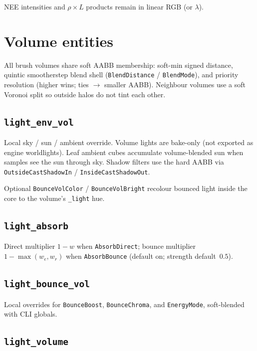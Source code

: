 \documentclass[11pt,a4paper]{article}
\newcommand{\ent}[1]{\texttt{#1}}
\newcommand{\code}[1]{\texttt{#1}}
\begin{document}
NEE intensities and $\rho\times L$ products remain in linear RGB (or $\lambda$).

\section{Volume entities}
\label{sec:volumes}

All brush volumes share soft AABB membership: soft-min signed distance, quintic
smootherstep blend shell (\code{BlendDistance} / \code{BlendMode}), and
priority resolution (higher wins; ties $\to$ smaller AABB). Neighbour volumes
use a soft Voronoi split so outside halos do not tint each other.

\subsection{\ent{light\_env\_vol}}

Local sky / sun / ambient override. Volume lights are bake-only (not exported
as engine worldlights). Leaf ambient cubes accumulate volume-blended sun when
samples see the sun through sky. Shadow filters use the hard AABB via
\code{OutsideCastShadowIn} / \code{InsideCastShadowOut}.

Optional \code{BounceVolColor} / \code{BounceVolBright} recolour bounced light
inside the core to the volume's \code{\_light} hue.

\subsection{\ent{light\_absorb}}

Direct multiplier $1-w$ when \code{AbsorbDirect}; bounce multiplier
$1-\max(w_e,w_r)$ when \code{AbsorbBounce} (default on; strength default~$0.5$).

\subsection{\ent{light\_bounce\_vol}}

Local overrides for \code{BounceBoost}, \code{BounceChroma}, and
\code{EnergyMode}, soft-blended with CLI globals.

\subsection{\ent{light\_volume}}
\end{document}
